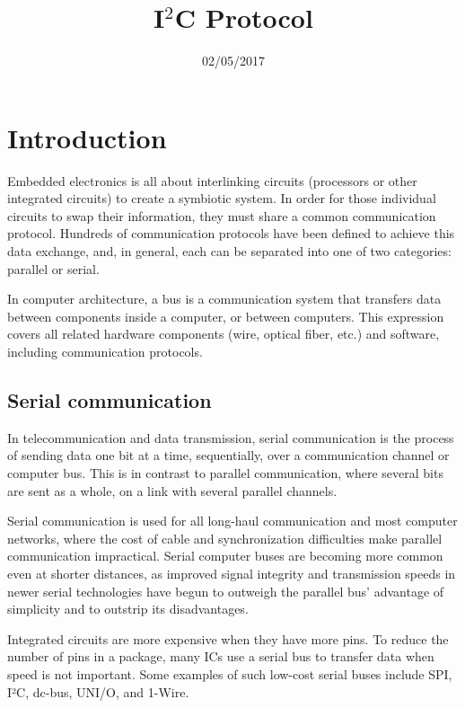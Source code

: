 \documentclass[12pt,twocolumn]{IEEEtran}
\title{I$^{2}$C Protocol}
\date{02/05/2017}
\begin{document}
  \maketitle
    \section{Introduction}
    
     Embedded electronics is all about interlinking circuits (processors or other integrated circuits) to create a symbiotic system. In order for those individual circuits to swap their information, they must share a common communication protocol. Hundreds of communication protocols have been defined to achieve this data exchange, and, in general, each can be separated into one of two categories: parallel or serial.

In computer architecture, a bus is a communication system that transfers data between components inside a computer, or between computers. This expression covers all related hardware components (wire, optical fiber, etc.) and software, including communication protocols.

   \subsection {Serial communication}

In telecommunication and data transmission, serial communication is the process of sending data one bit at a time, sequentially, over a communication channel or computer bus. This is in contrast to parallel communication, where several bits are sent as a whole, on a link with several parallel channels.

Serial communication is used for all long-haul communication and most computer networks, where the cost of cable and synchronization difficulties make parallel communication impractical. Serial computer buses are becoming more common even at shorter distances, as improved signal integrity and transmission speeds in newer serial technologies have begun to outweigh the parallel bus' advantage of simplicity and to outstrip its disadvantages.

Integrated circuits are more expensive when they have more pins. To reduce the number of pins in a package, many ICs use a serial bus to transfer data when speed is not important. Some examples of such low-cost serial buses include SPI, I²C, dc-bus, UNI/O, and 1-Wire.

  
\end{document}
